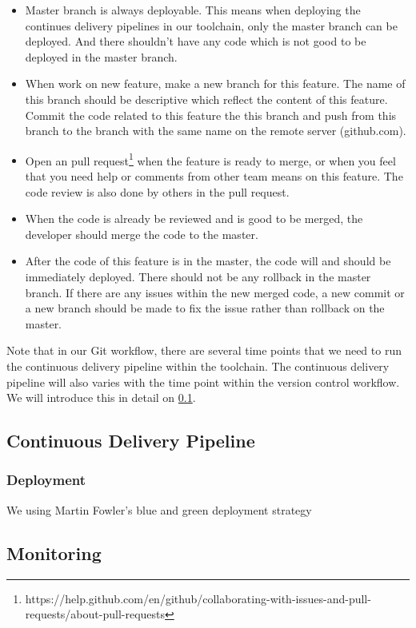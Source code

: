 \begin{itemize}
    \item Master branch is always deployable. This means when deploying the continues delivery pipelines in our toolchain, only the master branch can be deployed. And there shouldn't have any code which is not good to be deployed in the master branch. 
    \item When work on new feature, make a new branch for this feature. The name of this branch should be descriptive which reflect the content of this feature. Commit the code related to this feature the this branch and push from this branch to the branch with the same name on the remote server (github.com).
    \item Open an pull request\footnote{https://help.github.com/en/github/collaborating-with-issues-and-pull-requests/about-pull-requests} when the feature is ready to merge, or when you feel that you need help or comments from other team means on this feature. The code review is also done by others in the pull request.
    \item When the code is already be reviewed and is good to be merged, the developer should merge the code to the master.
    \item After the code of this feature is in the master, the code will and should be immediately deployed. There should not be any rollback in the master branch. If there are any issues within the new merged code, a new commit or a new branch should be made to fix the issue rather than rollback on the master.
\end{itemize}
\par
Note that in our Git workflow, there are several time points that we need to run the continuous delivery pipeline within the toolchain. The continuous delivery pipeline will also varies with the time point within the version control workflow. We will introduce this in detail on \ref{our-ci}.
\subsection{Continuous Delivery Pipeline}
\label{our-ci}
\subsubsection{Deployment}
We using Martin Fowler's blue and green deployment strategy \cite{fowler2010bluegreendeployment}
\subsection{Monitoring}
